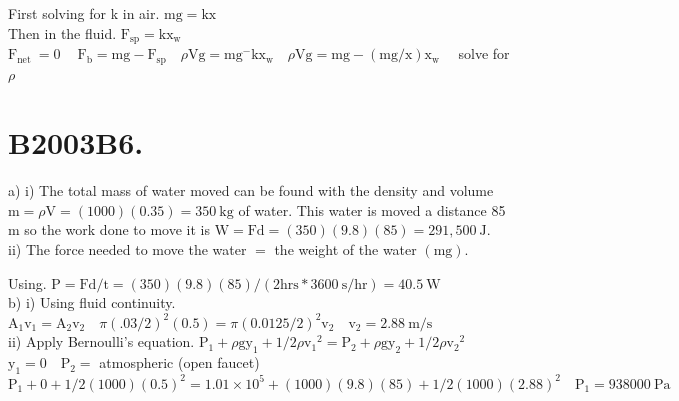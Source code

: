 \begin{enumerate}
First solving for k in air. $\mathrm{mg}=\mathrm{kx}$\\
Then in the fluid. $\mathrm{F}_{\mathrm{sp}}=\mathrm{kx}_{\mathrm{w}}$\\
$\mathrm{F}_{\text {net }}=0 \quad \mathrm{~F}_{\mathrm{b}}=\mathrm{mg}-\mathrm{F}_{\mathrm{sp}} \quad \rho \mathrm{Vg}=\mathrm{mg}^{-} \mathrm{kx}_{\mathrm{w}} \quad \rho \mathrm{Vg}=\mathrm{mg}-(\mathrm{mg} / \mathrm{x}) \mathrm{x}_{\mathrm{w}} \quad$ solve for $\rho$

\section*{B2003B6.}
a) i) The total mass of water moved can be found with the density and volume $\mathrm{m}=\rho \mathrm{V}=(1000)(0.35)=350 \mathrm{~kg}$ of water. This water is moved a distance 85 m so the work done to move it is $\mathrm{W}=\mathrm{Fd}=(350)(9.8)(85)=291,500 \mathrm{~J}$.\\
ii) The force needed to move the water $=$ the weight of the water $(\mathrm{mg})$.

Using. $\mathrm{P}=\mathrm{Fd} / \mathrm{t}=(350)(9.8)(85) /(2 \mathrm{hrs} * 3600 \mathrm{~s} / \mathrm{hr})=40.5 \mathrm{~W}$\\
b) i) Using fluid continuity. $\mathrm{A}_{1} \mathrm{v}_{1}=\mathrm{A}_{2} \mathrm{v}_{2} \quad \pi(.03 / 2)^{2}(0.5)=\pi(0.0125 / 2)^{2} \mathrm{v}_{2} \quad \mathrm{v}_{2}=2.88 \mathrm{~m} / \mathrm{s}$\\
ii) Apply Bernoulli's equation. $\mathrm{P}_{1}+\rho \mathrm{gy}_{1}+1 / 2 \rho \mathrm{v}_{1}{ }^{2}=\mathrm{P}_{2}+\rho \mathrm{gy}_{2}+1 / 2 \rho \mathrm{v}_{2}{ }^{2}$\\
$\mathrm{y}_{1}=0 \quad \mathrm{P}_{2}=$ atmospheric (open faucet)\\
$\mathrm{P}_{1}+0+1 / 2(1000)(0.5)^{2}=1.01 \times 10^{5}+(1000)(9.8)(85)+1 / 2(1000)(2.88)^{2} \quad \mathrm{P}_{1}=938000 \mathrm{~Pa}$


\end{enumerate}
